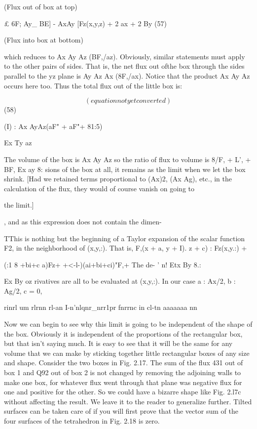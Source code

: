  
(Flux out of box at top)

£ 6F; Ay_ BE]
- AxAy [Fz(x,y,z) + 2 ax + 2 By (57)

(Flux into box at bottom)

which reduces to Ax Ay Az (BF,/az). Obviously, similar statements
must apply to the other pairs of sides. That is, the net flux out ofthe
box through the sides parallel to the yz plane is Ay Az Ax (8F,/ax).
Notice that the product Ax Ay Az occurs here too. Thus the total
flux out of the little box is:

\begin{equation}
(equation not yet converted)
\end{equation}
(58)

(I) : Ax AyAz(aF" + aF"+ 81:5)

Ex Ty az

The volume of the box is Ax Ay Az so the ratio of flux to volume is
8/F, + L', + BF,
Ex ay 8:
sions of the box at all, it remains as the limit when we let the box
shrink. [Had we retained terms proportional to (Ax)2, (Ax Ag), etc.,
in the calculation of the flux, they would of course vanish on going to

the limit.]

, and as this expression does not contain the dimen-

TThis is nothing but the beginning of a Taylor expansion of the scalar function F2,
in the neighborhood of (x,y,:). That is, F,(x + a, y + I). z + c) : Fz(x,y.:) +

(:1 8 +bi+c a)Fz+  +<-l-)(ai+bi+ci)"F,+  The de-
' n! Etx By 8.:

Ex By oz
rivatives are all to be evaluated at (x,y,:). In our case a : Ax/2, b : Ag/2, c = 0,

rinrl um rlrnn rl-an I-n'nlqnr_nrr1pr fnrrnc in cl-tn aaaaaaa nn

Now we can begin to see why this limit is going to be independent
of the shape of the box. Obviously it is independent of the proportions
of the rectangular box, but that isn't saying much. It is easy to
see that it will be the same for any volume that we can make by sticking
together little rectangular boxes of any size and shape. Consider
the two boxes in Fig. 2.17. The sum of the flux 431 out of box 1 and
Q92 out of box 2 is not changed by removing the adjoining walls to
make one box, for whatever flux went through that plane was negative
flux for one and positive for the other. So we could have a
bizarre shape like Fig. 2.l7c without affecting the result. We leave it
to the reader to generalize further. Tilted surfaces can be taken care
of if you will first prove that the vector sum of the four surfaces of the
tetrahedron in Fig. 2.18 is zero.

